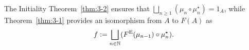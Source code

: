 The Initiality Theorem~\ref{thm:3-2} ensures that \(\bigsqcup_{n \ge 1}(\mu_n \circ \mu_n^\star) = 1_A\), while Theorem~\ref{thm:3-1} provides an isomorphism from \(A\) to \(F(A)\) as
\begin{equation*}
  f := \bigsqcup_{n \in \mathbb{N}}(F^\textup{E}(\mu_{n-1}) \circ \mu_n^\star).
\end{equation*}

